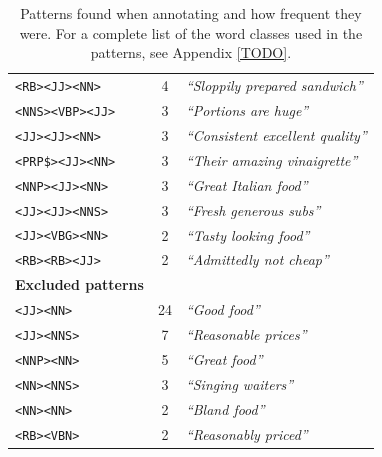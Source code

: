 \documentclass[a4paper,11pt]{kth-mag}
\begin{document}
\begin{table}[t]
\begin{tabular}{| l | c | l |}
    \texttt{<RB><JJ><NN>} & 4 & \emph{``Sloppily prepared sandwich''}\\
    \texttt{<NNS><VBP><JJ>} & 3 & \emph{``Portions are huge''}\\
    \texttt{<JJ><JJ><NN>} & 3 & \emph{``Consistent excellent quality''}\\
    \texttt{<PRP\$><JJ><NN>} & 3 & \emph{``Their amazing vinaigrette''}\\
    \texttt{<NNP><JJ><NN>} & 3 & \emph{``Great Italian food''}\\
    \texttt{<JJ><JJ><NNS>} & 3 & \emph{``Fresh generous subs''}\\
    \texttt{<JJ><VBG><NN>} & 2 & \emph{``Tasty looking food''}\\
    \texttt{<RB><RB><JJ>} & 2 & \emph{``Admittedly not cheap''}\\
    \hline
    \textbf{Excluded patterns} && \\
    \hline
    \texttt{<JJ><NN>} & 24 & \emph{``Good food''}\\
    \texttt{<JJ><NNS>} & 7 & \emph{``Reasonable prices''}\\
    \texttt{<NNP><NN>} & 5 & \emph{``Great food''}\\
    \texttt{<NN><NNS>} & 3 & \emph{``Singing waiters''}\\
    \texttt{<NN><NN>} & 2 & \emph{``Bland food''}\\
    \texttt{<RB><VBN>} & 2 & \emph{``Reasonably priced''}\\
    \hline
  \end{tabular}
  \caption{Patterns found when annotating and how frequent they were.
    For a complete list of the word classes used in the patterns, see Appendix \ref{TODO}.
  }
  \label{tab:used_pos}
\end{table}
\end{document}
